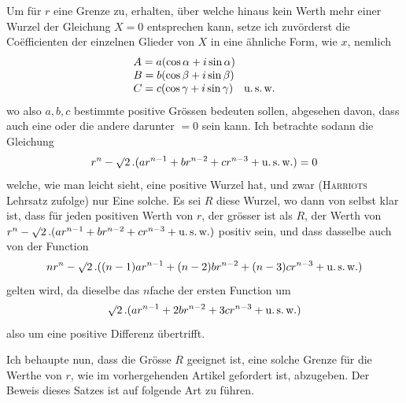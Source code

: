 Um für $r$ eine Grenze zu, erhalten, über welche hinaus kein Werth mehr
einer Wurzel der Gleichung $X=0$ entsprechen kann, setze ich zuvörderst die
Coëfficienten der einzelnen Glieder von $X$ in eine ähnliche Form, wie $x$, nemlich
\[
\begin{array}{l}
A=a(\cos\alpha+i\sin\alpha)\\
B=b(\cos\beta+i\sin\beta)\\
C=c(\cos\gamma+i\sin\gamma)\quad\mbox{u.\,s.\,w.}
\end{array}
\]
wo also $a,b,c$ bestimmte positive Grössen bedeuten sollen, abgesehen davon,
dass auch eine oder die andere darunter $=0$ sein kann. Ich betrachte sodann
die Gleichung
\[
r^n-\surd2\,.(ar^{n-1}+br^{n-2}+cr^{n-3}+\mbox{u.\,s.\,w.})=0
\]
welche, wie man leicht sieht, eine positive Wurzel hat, und zwar (\textsc{Harriots} Lehrsatz zufolge) nur Eine solche. Es sei $R$ diese Wurzel, wo dann von selbst klar
ist, dass für jeden positiven Werth von $r$, der grösser ist als $R$, der Werth von
$r^n-\surd2\,.(ar^{n-1}+br^{n-2}+cr^{n-3}+\mbox{u.\,s.\,w.})$ positiv sein, und dass dasselbe auch
von der Function
\[
nr^n-\surd2\,.((n-1)ar^{n-1}+(n-2)br^{n-2}+(n-3)cr^{n-3}+\mbox{u.\,s.\,w.})
\]
gelten wird, da dieselbe das $n$fache der ersten Function um
\[
\surd2\,.(ar^{n-1}+2br^{n-2}+3cr^{n-3}+\mbox{u.\,s.\,w.})
\]
also um eine positive Differenz übertrifft.

Ich behaupte nun, dass die Grösse $R$ geeignet ist, eine solche Grenze für
die Werthe von $r$, wie im vorhergehenden Artikel gefordert ist, abzugeben. Der
Beweis dieses Satzes ist auf folgende Art zu führen.

